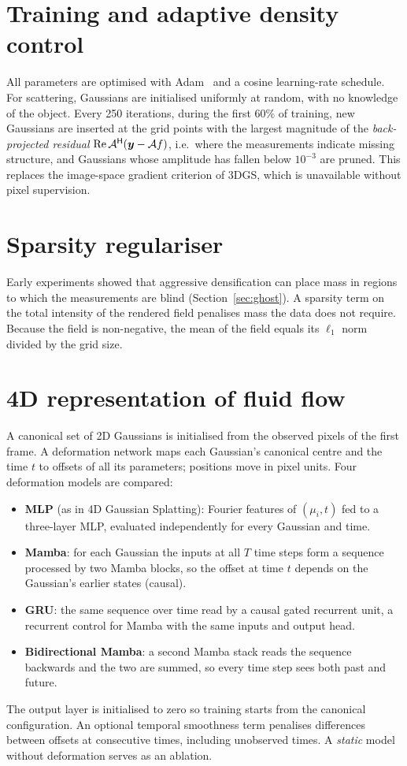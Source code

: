\section{Training and adaptive density control}
All parameters are optimised with Adam~\citep{kingma2015adam} and a cosine learning-rate schedule. For scattering,
Gaussians are initialised uniformly at random, with no knowledge of the object. Every 250 iterations, during the
first 60\% of training, new Gaussians are inserted at the grid points with the largest magnitude of the
\emph{back-projected residual} $\mathrm{Re}\,\mathcal{A}^{\mathsf H}(\bm{y}-\mathcal{A}f)$, i.e.\ where the
measurements indicate missing structure, and Gaussians whose amplitude has fallen below $10^{-3}$ are pruned. This
replaces the image-space gradient criterion of 3DGS, which is unavailable without pixel supervision.

\section{Sparsity regulariser}
Early experiments showed that aggressive densification can place mass in regions to which the measurements are blind
(Section~\ref{sec:ghost}). A sparsity term on the total intensity of the rendered field penalises mass the data does
not require. Because the field is non-negative, the mean of the field equals its $\ell_1$ norm divided by the grid size.

\section{4D representation of fluid flow}
A canonical set of 2D Gaussians is initialised from the observed pixels of the first frame. A deformation network maps
each Gaussian's canonical centre and the time $t$ to offsets of all its parameters; positions move in pixel units.
Four deformation models are compared:
\begin{itemize}
  \item \textbf{MLP} (as in 4D Gaussian Splatting): Fourier features of $(\mu_i,t)$ fed to a three-layer MLP,
  evaluated independently for every Gaussian and time.
  \item \textbf{Mamba}: for each Gaussian the inputs at all $T$ time steps form a sequence processed by two Mamba
  blocks, so the offset at time $t$ depends on the Gaussian's earlier states (causal).
  \item \textbf{GRU}: the same sequence over time read by a causal gated recurrent unit, a recurrent control for
  Mamba with the same inputs and output head.
  \item \textbf{Bidirectional Mamba}: a second Mamba stack reads the sequence backwards and the two are summed, so
  every time step sees both past and future.
\end{itemize}
The output layer is initialised to zero so training starts from the canonical configuration. An optional temporal
smoothness term penalises differences between offsets at consecutive times, including unobserved times. A
\emph{static} model without deformation serves as an ablation.


